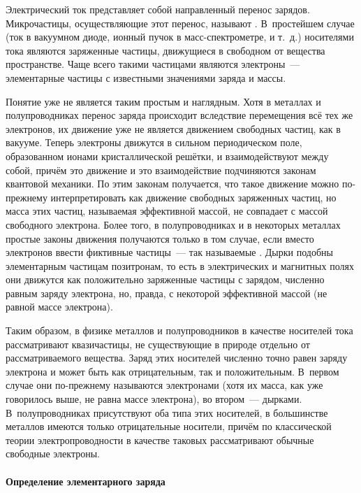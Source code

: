 Электрический ток представляет собой направленный перенос зарядов. Микрочастицы,
осуществляющие этот перенос, называют . В~простейшем
случае (ток в вакуумном диоде, ионный пучок в масс-спектрометре, и т.~д.)
носителями тока являются заряженные частицы, движущиеся в свободном от вещества
пространстве. Чаще всего такими частицами являются электроны~--- элементарные
частицы с известными значениями заряда и массы.

Понятие  уже не является таким простым и
наглядным. Хотя в металлах и полупроводниках перенос заряда происходит
вследствие перемещения всё тех же электронов, их движение уже не является
движением свободных частиц, как в вакууме. Теперь электроны движутся в сильном
периодическом поле, образованном ионами кристаллической решётки, и
взаимодействуют между собой, причём это движение и это взаимодействие
подчиняются законам квантовой механики. По этим законам получается, что такое
движение можно по-прежнему интерпретировать как движение свободных заряженных
частиц, но масса этих частиц, называемая эффективной массой, не совпадает с
массой свободного электрона. Более того, в полупроводниках и в некоторых
металлах простые законы движения получаются только в том случае, если вместо
электронов ввести фиктивные частицы~--- так называемые . Дырки
подобны элементарным частицам позитронам, то есть в электрических и магнитных
полях они движутся как положительно заряженные частицы с зарядом, численно
равным заряду электрона, но, правда, с некоторой эффективной массой (не равной
массе электрона).

Таким образом, в физике металлов и полупроводников в качестве носителей тока
рассматривают квазичастицы, не существующие в природе отдельно от
рассматриваемого вещества. Заряд этих носителей численно точно равен заряду
электрона и может быть как отрицательным, так и положительным. В~первом случае
они по-прежнему называются электронами (хотя их масса, как уже говорилось выше,
не равна массе электрона), во втором~--- дырками. В~полупроводниках присутствуют
оба типа этих носителей, в большинстве металлов имеются только отрицательные
носители, причём по классической теории электропроводности в качестве таковых
рассматривают обычные свободные электроны.

\paragraph{Определение элементарного заряда}

